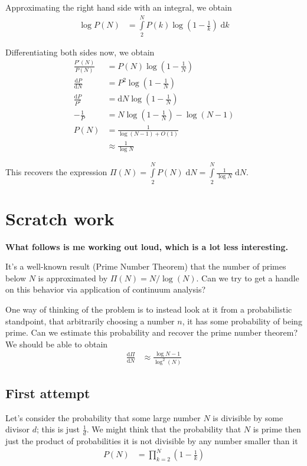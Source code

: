 \documentclass[12pt]{report}
\newcommand*{\rd}[2]{\frac{\mathrm{d}#1}{\mathrm{d}#2}}
\begin{document}
Approximating the right hand side with an integral, we obtain
\begin{align}
    \log P(N) &= \int\limits_{2}^{N}P(k)\log\left( 1 - \frac{1}{k}
    \right)\;\mathrm{d}k
\end{align}

Differentiating both sides now, we obtain
\begin{align}
    \frac{P'(N)}{P(N)} &= P(N)\log\left( 1 - \frac{1}{N} \right)\\
    \rd{P}{N} &= P^2\log\left( 1 - \frac{1}{N} \right)\\
    \frac{\mathrm{d}P}{P^2} &= \mathrm{d}N \log\left( 1 - \frac{1}{N} \right)\\
    -\frac{1}{P} &= N\log\left( 1 - \frac{1}{N} \right) - \log(N - 1)\\
    P(N) &= \frac{1}{\log(N - 1) + O(1)}\\
    &\approx \frac{1}{\log N}
\end{align}

This recovers the expression $\Pi(N) = \int\limits_{2}^{N}P(N)\;\mathrm{d}N =
\int\limits_{2}^{N}\frac{1}{\log N}\;\mathrm{d}N$.

\section{Scratch work}

\textbf{What follows is me working out loud, which is a lot less interesting.}

It's a well-known result (Prime Number Theorem) that the number of primes below
$N$ is approximated by $\Pi(N) = N/\log(N)$. Can we try to get a handle on this
behavior via application of continuum analysis?

One way of thinking of the problem is to instead look at it from a probabilistic
standpoint, that arbitrarily choosing a number $n$, it has some probability of
being prime. Can we estimate this probability and recover the prime number
theorem? We should be able to obtain
\begin{align}
    \rd{\Pi}{N} &\approx \frac{\log N - 1}{\log^2(N)}
\end{align}

\subsection{First attempt}

Let's consider the probability that some large number $N$ is divisible by some
divisor $d$; this is just $\frac{1}{d}$. We might think that the probability
that $N$ is prime then just the product of probabilities it is not divisible by
any number smaller than it
\begin{align}
    P(N) &= \prod_{k=2}^N \left( 1 - \frac{1}{k} \right)\label{2-prod}
\end{align}
\end{document}

